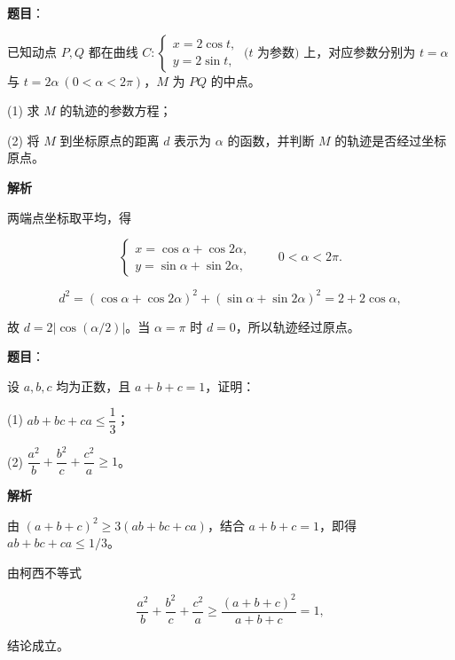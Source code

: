 \begin{answer}

\textbf{题目}：

已知动点 $P,Q$ 都在曲线 $C:\begin{cases}x=2\cos t,\\y=2\sin t,\end{cases}\ (t$ 为参数$)$ 上，对应参数分别为 $t=\alpha$ 与 $t=2\alpha\ (0<\alpha<2\pi)$，$M$ 为 $PQ$ 的中点。

(1) 求 $M$ 的轨迹的参数方程；

(2) 将 $M$ 到坐标原点的距离 $d$ 表示为 $\alpha$ 的函数，并判断 $M$ 的轨迹是否经过坐标原点。

\textbf{解析}


两端点坐标取平均，得

\nopagebreak[4]
\[\begin{cases}x=\cos\alpha+\cos2\alpha,\\y=\sin\alpha+\sin2\alpha,\end{cases}\qquad0<\alpha<2\pi.\]


\nopagebreak[4]
\[d^2=(\cos\alpha+\cos2\alpha)^2+(\sin\alpha+\sin2\alpha)^2=2+2\cos\alpha,\]

故 $d=2|\cos(\alpha/2)|$。当 $\alpha=\pi$ 时 $d=0$，所以轨迹经过原点。



\end{answer}
\begin{answer}

\textbf{题目}：

设 $a,b,c$ 均为正数，且 $a+b+c=1$，证明：

(1) $ab+bc+ca\leqslant\dfrac13$；

(2) $\dfrac{a^2}{b}+\dfrac{b^2}{c}+\dfrac{c^2}{a}\geqslant1$。

\textbf{解析}


由 $(a+b+c)^2\geqslant3(ab+bc+ca)$，结合 $a+b+c=1$，即得 $ab+bc+ca\leqslant1/3$。


由柯西不等式

\nopagebreak[4]
\[\frac{a^2}{b}+\frac{b^2}{c}+\frac{c^2}{a}\geqslant\frac{(a+b+c)^2}{a+b+c}=1,\]

结论成立。



\end{answer}